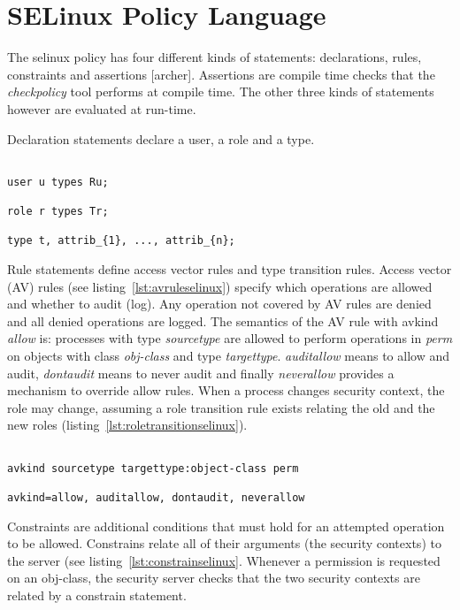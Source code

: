 \section{SELinux Policy Language}

The \ac{selinux} policy has four different kinds of statements: declarations, rules, constraints and assertions [archer]. Assertions are compile time checks that the \emph{checkpolicy} tool performs at compile time. The other three kinds of statements however are evaluated at run-time. 

Declaration statements declare a user, a role and a type. 

\lstset{language=selinux}
\begin{lstlisting}[frame=single, caption={Declarations},label={lst:declsselinux}]

user u types Ru;

role r types Tr;

type t, attrib_{1}, ..., attrib_{n};

\end{lstlisting}

Rule statements define access vector rules and type transition rules. Access vector (AV) rules (see listing~\ref{lst:avruleselinux}) specify which operations are allowed and whether to audit (log). Any operation not covered by AV rules are denied and all denied operations are logged. The semantics of the AV rule with avkind \emph{allow} is: processes with type \emph{sourcetype} are allowed to perform operations in \emph{perm} on objects with class \emph{obj-class} and type \emph{targettype}. \emph{auditallow} means to allow and audit, \emph{dontaudit} means to never audit and finally \emph{neverallow} provides a mechanism to override allow rules. When a process changes security context, the role may change, assuming a role transition rule exists relating the old and the new roles (listing~\ref{lst:roletransitionselinux}).

\lstset{language=selinux}
\begin{lstlisting}[frame=single, caption={AV rule},label={lst:avruleselinux}]

avkind sourcetype targettype:object-class perm

avkind=allow, auditallow, dontaudit, neverallow
\end{lstlisting}

Constraints are additional conditions that must hold for an attempted operation to be allowed. Constrains relate all of their arguments (the security contexts) to the server (see listing~\ref{lst:constrainselinux}. Whenever a permission is requested on an obj-class, the security server checks that the two security contexts are related by a constrain statement.

